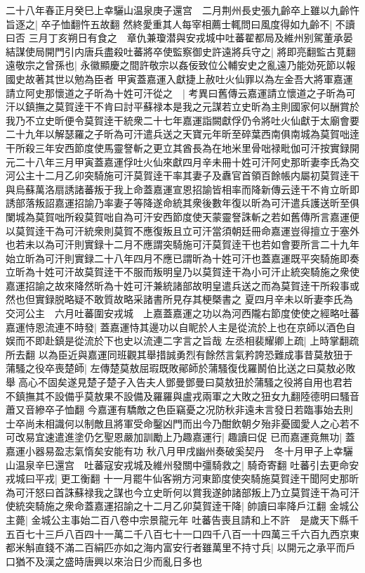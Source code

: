 二十八年春正月癸巳上幸驪山温泉庚子還宫　二月荆州長史張九齡卒上雖以九齡忤旨逐之|{
	卒子恤翻忤五故翻}
然終愛重其人每宰相薦士輒問曰風度得如九齡不|{
	不讀曰否}
三月丁亥朔日有食之　章仇兼瓊潜與安戎城中吐蕃翟都局及維州别駕董承晏結謀使局開門引内唐兵盡殺吐蕃將卒使監察御史許遠將兵守之|{
	將即亮翻監古莧翻}
遠敬宗之曾孫也|{
	永徽顯慶之間許敬宗以姦佞致位公輔安史之亂遠乃能効死節以報國史故著其世以勉為臣者}
甲寅蓋嘉運入獻捷上赦吐火仙罪以為左金吾大將軍嘉運請立阿史那懷道之子昕為十姓可汗從之　|{
	考異曰舊傳云嘉運請立懷道之子昕為可汗以鎮撫之莫賀逹干不肯曰討平蘇禄本是我之元謀若立史昕為主則國家何以酬賞於我乃不立史昕便令莫賀逹干統衆二十七年嘉運詣闕獻俘仍令將吐火仙獻于太廟會要二十九年以解瑟羅之子昕為可汗遣兵送之天寶元年昕至碎葉西南俱南城為莫賀咄逹干所殺三年安西節度使馬靈詧斬之更立其酋長為在地米里骨咄禄毗伽可汗按實録開元二十八年三月甲寅蓋嘉運俘吐火仙來獻四月辛未冊十姓可汗阿史那昕妻李氏為交河公主十二月乙卯突騎施可汗莫賀逹干率其妻子及纛官首領百餘帳内屬初莫賀逹干與烏蘇萬洛扇誘諸蕃叛于我上命蓋嘉運宣恩招諭皆相率而降新傳云逹干不肯立昕即誘部落叛詔嘉運招諭乃率妻子等降遂命統其衆後數年復以昕為可汗遣兵護送昕至俱闌城為莫賀咄所殺莫賀咄自為可汗安西節度使天蒙靈詧誅斬之若如舊傳所言嘉運便以莫賀逹干為可汗統衆則莫賀不應復叛且立可汗當須朝廷冊命嘉運豈得擅立于塞外也若未以為可汗則實録十二月不應謂突騎施可汗莫賀逹干也若如會要所言二十九年始立昕為可汗則實録二十八年四月不應已謂昕為十姓可汗也蓋嘉運既平突騎施即奏立昕為十姓可汗故莫賀逹干不服而叛明皇乃以莫賀逹干為小可汗止統突騎施之衆使嘉運招諭之故來降然昕為十姓可汗兼統諸部故明皇遣兵送之而為莫賀逹干所殺事或然也但實録脱略疑不敢質故略采諸書所見存其梗槩書之}
夏四月辛未以昕妻李氏為交河公主　六月吐蕃圍安戎城　上嘉蓋嘉運之功以為河西隴右節度使使之經略吐蕃嘉運恃恩流連不時發|{
	蓋嘉運恃其邊功以自眤於人主是從流於上也在京師以酒色自娱而不即赴鎮是從流於下也史以流連二字言之旨哉}
左丞相裴耀卿上疏|{
	上時掌翻疏所去翻}
以為臣近與嘉運同班觀其舉措誠勇烈有餘然言氣矜誇恐難成事昔莫敖狃于蒲騷之役卒喪楚師|{
	左傳楚莫敖屈瑕既敗鄖師於蒲騷復伐羅鬭伯比送之曰莫敖必敗舉高心不固矣遂見楚子楚子入告夫人鄧曼鄧曼曰莫敖狃於蒲騷之役將自用也君若不鎮撫其不設備乎莫敖果不設備及羅羅與盧戎兩軍之大敗之狃女九翻陸德明曰騷音蕭又音縿卒子恤翻}
今嘉運有驕敵之色臣竊憂之况防秋非遠未言發日若臨事始去則士卒尚未相識何以制敵且將軍受命鑿凶門而出今乃酣飲朝夕殆非憂國愛人之心若不可改易宜速遣進塗仍乞聖恩嚴加訓勵上乃趣嘉運行|{
	趣讀曰促}
已而嘉運竟無功|{
	蓋嘉運小器易盈志氣惰矣安能有功}
秋八月甲戌幽州奏破奚契丹　冬十月甲子上幸驪山温泉辛巳還宫　吐蕃寇安戎城及維州發關中彊騎救之|{
	騎奇寄翻}
吐蕃引去更命安戎城曰平戎|{
	更工衡翻}
十一月罷牛仙客朔方河東節度使突騎施莫賀逹干聞阿史那昕為可汗怒曰首誅蘇禄我之謀也今立史昕何以賞我遂帥諸部叛上乃立莫賀逹干為可汗使統突騎施之衆命蓋嘉運招諭之十二月乙卯莫賀逹干降|{
	帥讀曰率降戶江翻}
金城公主薨|{
	金城公主事始二百八卷中宗景龍元年}
吐蕃告喪且請和上不許　是歲天下縣千五百七十三戶八百四十一萬二千八百七十一口四千八百一十四萬三千六百九西京東都米斛直錢不滿二百絹匹亦如之海内富安行者雖萬里不持寸兵|{
	以開元之承平而戶口猶不及漢之盛時唐興以來治日少而亂日多也}


